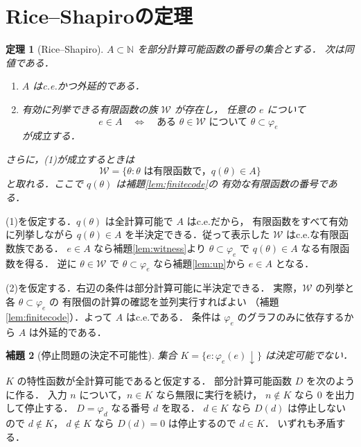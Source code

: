 \documentclass[a5paper,10pt,onecolumn]{jsarticle}
\makeatletter
\theoremstyle{mathnotetheorem}
\newtheorem{theorem}{定理}[section]
\newtheorem{lemma}[theorem]{補題}
\renewcommand{\proofname}{証明}
\renewenvironment{proof}[1][\proofname]{%
  \par\pushQED{\qed}\normalfont\topsep4\p@\@plus2\p@\relax
  \trivlist\item[\hskip\labelsep\bfseries #1]\ignorespaces
}{\popQED\endtrivlist\@endpefalse}
\makeatother
\begin{document}
\section{Rice--Shapiroの定理}
\begin{theorem}[Rice--Shapiro]\label{thm:rs}
$A\subset\mathbb N$ を部分計算可能函数の番号の集合とする．
次は同値である．
\begin{enumerate}
\item $A$ はc.e.かつ外延的である．
\item 有効に列挙できる有限函数の族 $\mathcal W$ が存在し，
任意の $e$ について
\[
 e\in A\quad\Longleftrightarrow\quad
 \text{ある }\theta\in\mathcal W\text{ について }
 \theta\subset\varphi_e
\]
が成立する．
\end{enumerate}
さらに，(1)が成立するときは
\[
 \mathcal W=\{\theta:\theta\text{ は有限函数で，}
               q(\theta)\in A\}
\]
と取れる．ここで $q(\theta)$ は補題\ref{lem:finitecode}の
有効な有限函数の番号である．
\end{theorem}
\begin{proof}
(1)を仮定する．$q(\theta)$ は全計算可能で $A$ はc.e.だから，
有限函数をすべて有効に列挙しながら
$q(\theta)\in A$ を半決定できる．従って表示した
$\mathcal W$ はc.e.な有限函数族である．
$e\in A$ なら補題\ref{lem:witness}より
$\theta\subset\varphi_e$ で $q(\theta)\in A$ なる有限函数を得る．
逆に $\theta\in\mathcal W$ で
$\theta\subset\varphi_e$ なら補題\ref{lem:up}から $e\in A$ となる．

(2)を仮定する．右辺の条件は部分計算可能に半決定できる．
実際，$\mathcal W$ の列挙と各 $\theta\subset\varphi_e$ の
有限個の計算の確認を並列実行すればよい
（補題\ref{lem:finitecode}）．よって $A$ はc.e.である．
条件は $\varphi_e$ のグラフのみに依存するから
$A$ は外延的である．
\end{proof}

\begin{lemma}[停止問題の決定不可能性]\label{lem:halting}
集合 $K=\{e:\varphi_e(e)\downarrow\}$ は決定可能でない．
\end{lemma}
\begin{proof}
$K$ の特性函数が全計算可能であると仮定する．
部分計算可能函数 $D$ を次のように作る．
入力 $n$ について，$n\in K$ なら無限に実行を続け，
$n\notin K$ なら $0$ を出力して停止する．
$D=\varphi_d$ なる番号 $d$ を取る．
$d\in K$ なら $D(d)$ は停止しないので $d\notin K$，
$d\notin K$ なら $D(d)=0$ は停止するので $d\in K$．
いずれも矛盾する．
\end{proof}
\end{document}
